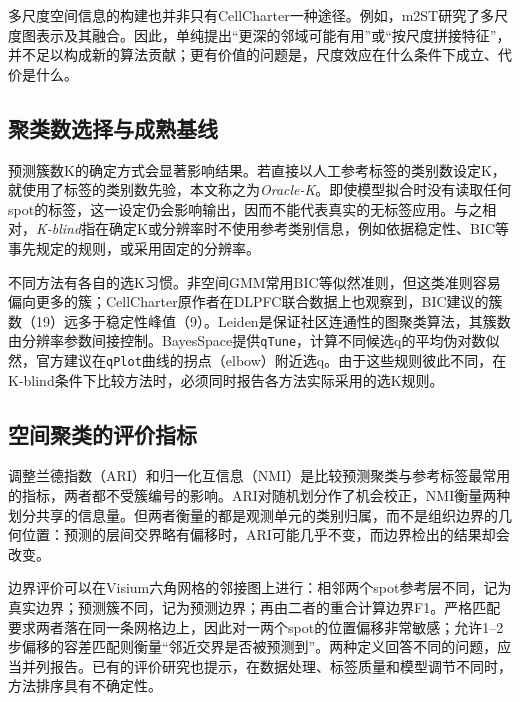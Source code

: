 多尺度空间信息的构建也并非只有CellCharter一种途径。例如，m2ST研究了多尺度图表示及其融合\cite{zhang2025}。因此，单纯提出“更深的邻域可能有用”或“按尺度拼接特征”，并不足以构成新的算法贡献；更有价值的问题是，尺度效应在什么条件下成立、代价是什么。

\subsection{聚类数选择与成熟基线}
\label{subsec:cc-k-background-p1}
预测簇数K的确定方式会显著影响结果。若直接以人工参考标签的类别数设定K，就使用了标签的类别数先验，本文称之为\textit{Oracle-K}。即使模型拟合时没有读取任何spot的标签，这一设定仍会影响输出，因而不能代表真实的无标签应用。与之相对，\textit{K-blind}指在确定K或分辨率时不使用参考类别信息，例如依据稳定性、BIC等事先规定的规则，或采用固定的分辨率。

不同方法有各自的选K习惯。非空间GMM常用BIC等似然准则，但这类准则容易偏向更多的簇；CellCharter原作者在DLPFC联合数据上也观察到，BIC建议的簇数（19）远多于稳定性峰值（9）\cite{varrone2024}。Leiden是保证社区连通性的图聚类算法\cite{traag2019}，其簇数由分辨率参数间接控制。BayesSpace提供\texttt{qTune}，计算不同候选q的平均伪对数似然，官方建议在\texttt{qPlot}曲线的拐点（elbow）附近选q\cite{bayesspacevignette}。由于这些规则彼此不同，在K-blind条件下比较方法时，必须同时报告各方法实际采用的选K规则。

\subsection{空间聚类的评价指标}
\label{subsec:cc-evaluation-background-p1}
调整兰德指数（ARI）和归一化互信息（NMI）是比较预测聚类与参考标签最常用的指标，两者都不受簇编号的影响。ARI对随机划分作了机会校正，NMI衡量两种划分共享的信息量。但两者衡量的都是观测单元的类别归属，而不是组织边界的几何位置：预测的层间交界略有偏移时，ARI可能几乎不变，而边界检出的结果却会改变。

边界评价可以在Visium六角网格的邻接图上进行：相邻两个spot参考层不同，记为真实边界；预测簇不同，记为预测边界；再由二者的重合计算边界F1。严格匹配要求两者落在同一条网格边上，因此对一两个spot的位置偏移非常敏感；允许1--2步偏移的容差匹配则衡量“邻近交界是否被预测到”。两种定义回答不同的问题，应当并列报告。已有的评价研究也提示，在数据处理、标签质量和模型调节不同时，方法排序具有不确定性\cite{sun2026}。


